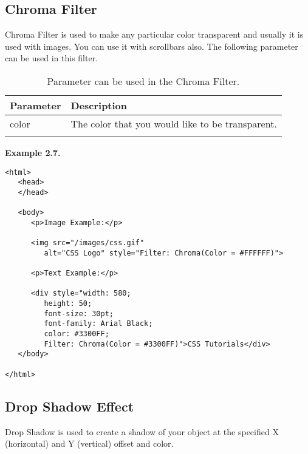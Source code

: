 \documentclass[a4paper,oneside]{book}
\numberwithin{equation}{chapter}
\begin{document}
\subsection{Chroma Filter}
Chroma Filter is used to make any particular color transparent and usually it is used with images. You can use it with scrollbars also. The following parameter can be used in this filter.
\begin{center}
\begin{longtable}{|l|l|}
\hline
\textbf{Parameter} & \textbf{Description}\\
\hline
color & The color that you would like to be transparent.\\
\hline
\caption{Parameter can be used in the Chroma Filter.}
\end{longtable}
\end{center}
\textbf{Example 2.7.}
\begin{verbatim}
<html>
   <head>
   </head>
   
   <body>
      <p>Image Example:</p>
      
      <img src="/images/css.gif" 
         alt="CSS Logo" style="Filter: Chroma(Color = #FFFFFF)">
      
      <p>Text Example:</p>
      
      <div style="width: 580; 
         height: 50; 
         font-size: 30pt; 
         font-family: Arial Black; 
         color: #3300FF; 
         Filter: Chroma(Color = #3300FF)">CSS Tutorials</div>
   </body>
   
</html>
\end{verbatim}
\subsection{Drop Shadow Effect}
Drop Shadow is used to create a shadow of your object at the specified X (horizontal) and Y (vertical) offset and color.
\end{document}
